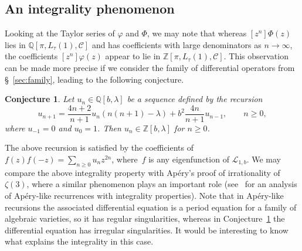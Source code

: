 \documentclass[12pt]{amsart}
\theoremstyle{plain}
\newtheorem{conjecture}{Conjecture}
\numberwithin{equation}{section}
\theoremstyle{definition}
\newcommand{\Z}{\mathbb{Z}}
\newcommand{\Q}{\mathbb{Q}}
\renewcommand{\phi}{\varphi}
\newcommand{\Cone}{\mathscr{C}}
\begin{document}
\subsection{An integrality phenomenon}
Looking at the Taylor series of $\phi$ and $\Phi$, we may note that whereas $[z^n]\Phi(z)$ lies in $\Q[\pi, L_{\tau}(1), \Cone]$ and has coefficients with large denominators as $n\to\infty$, the coefficients $[z^n]\phi(z)$ appear to lie in $\Z[\pi, L_{\tau}(1), \Cone]$. This observation can be made more precise if we consider the family of differential operators from \S~\ref{sec:family}, leading to the following conjecture.
\begin{conjecture} \label{conj:integrality}
Let $u_n\in\Q[b,\lambda]$ be a sequence defined by the recursion
	\[u_{n+1}=\frac{4n+2}{n+1}u_{n}(n(n+1)-\lambda)+b^2\frac{4n}{n+1}u_{n-1},\qquad n\ge0,\]
where $u_{-1}=0$ and $u_0=1$. Then $u_{n}\in\Z[b,\lambda]$ for $n\ge0$.
\end{conjecture} 
The above recursion is satisfied by the coefficients of $f(z)f(-z)=\sum_{n\ge0}u_nz^{2n}$, where~$f$ is any eigenfunction of $\mathcal{L}_{1,b}$. We may compare the above integrality property with Ap\'ery's proof of irrationality of~$\zeta(3)$, where a similar phenomenon plays an important role (see~\cite{zagier2009integral} for an analysis of Ap\'ery-like recurrences with integrality properties). Note that in Ap\'ery-like recursions the associated differential equation is a period equation for a family of algebraic varieties, so it has regular singularities, whereas in Conjecture~\ref{conj:integrality} the differential equation has irregular singularities. It would be interesting to know what explains the integrality in this case.




\end{document}
